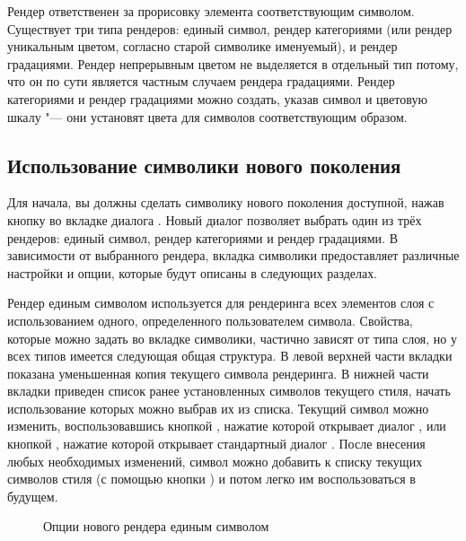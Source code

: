 
Рендер ответственен за прорисовку элемента соответствующим символом.
Существует три типа рендеров: единый символ, рендер категориями
(или рендер уникальным цветом, согласно старой символике именуемый),
и рендер градациями. Рендер непрерывным цветом не выделяется в отдельный
тип потому, что он по сути является частным случаем рендера градациями.
Рендер категориями и рендер градациями можно создать, указав символ
и цветовую шкалу "--- они установят цвета для символов соответствующим
образом.

\subsection{Использование символики нового поколения}

Для начала, вы должны сделать символику нового поколения доступной, нажав
кнопку  во вкладке  диалога
. Новый диалог позволяет выбрать один из
трёх рендеров: единый символ, рендер категориями и рендер градациями. В
зависимости от выбранного рендера, вкладка символики предоставляет различные
настройки и опции, которые будут описаны в следующих разделах.


Рендер единым символом используется для рендеринга всех элементов слоя с
использованием одного, определенного пользователем символа. Свойства, которые
можно задать во вкладке символики, частично зависят от типа слоя, но у всех
типов имеется следующая общая структура. В левой верхней части вкладки
показана уменьшенная копия текущего символа рендеринга. В нижней части
вкладки приведен список ранее установленных символов текущего стиля, начать
использование которых можно выбрав их из списка. Текущий символ можно
изменить, воспользовавшись кнопкой , нажатие которой
открывает диалог , или кнопкой ,
нажатие которой открывает стандартный диалог . После внесения
любых необходимых изменений, символ можно добавить к списку текущих символов
стиля (с помощью кнопки ) и потом легко
им воспользоваться в будущем.

\begin{figure}[ht]
\centering
   \hspace{1cm}
   \hspace{1cm}
\caption{Опции нового рендера единым символом \wincaption}
\end{figure}

